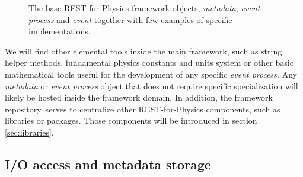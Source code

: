 \begin{figure}[]
  \centering
	\caption{The base REST-for-Physics framework objects, 
	\emph{metadata}, \emph{event process} and \emph{event} together with few examples of specific implementations.}  \label{fig:objects}
\end{figure}

We will find other elemental tools inside the main framework, such as string helper methods, fundamental physics constants and units system or other basic mathematical tools useful for the development of any specific \emph{event process}. Any \emph{metadata} or \emph{event process} object that does not require specific specialization will likely be hosted inside the framework domain.
 In addition, the framework repository\,\cite{REST_Framework_Git} serves to centralize other REST-for-Physics components, such as libraries or packages. Those components will be introduced in section\,\ref{sec:libraries}.%





\subsection{I/O access and metadata storage}



